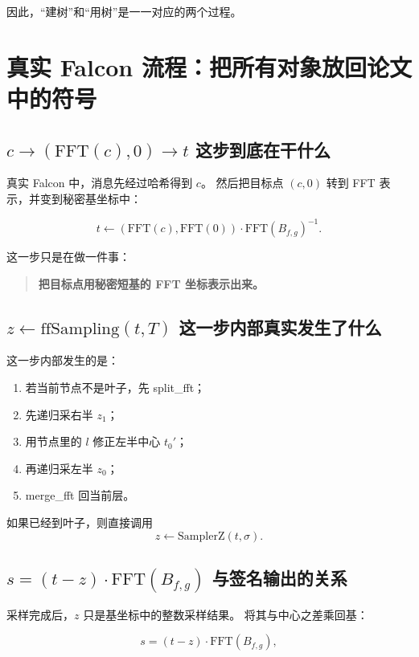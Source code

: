 \documentclass[11pt,a4paper]{ctexart}
\begin{document}
因此，“建树”和“用树”是一一对应的两个过程。

\section{真实 Falcon 流程：把所有对象放回论文中的符号}

\subsection{\(c \to (\mathrm{FFT}(c),0)\to t\) 这步到底在干什么}

真实 Falcon 中，消息先经过哈希得到 \(c\)。  
然后把目标点 \((c,0)\) 转到 FFT 表示，并变到秘密基坐标中：

\[
t \leftarrow (\mathrm{FFT}(c),\mathrm{FFT}(0))\cdot \mathrm{FFT}(B_{f,g})^{-1}.
\]

这一步只是在做一件事：

\begin{quote}
\textbf{把目标点用秘密短基的 FFT 坐标表示出来。}
\end{quote}

\subsection{\(z\leftarrow \mathrm{ffSampling}(t,T)\) 这一步内部真实发生了什么}

这一步内部发生的是：

\begin{enumerate}
    \item 若当前节点不是叶子，先 split\_fft；
    \item 先递归采右半 \(z_1\)；
    \item 用节点里的 \(l\) 修正左半中心 \(t_0'\)；
    \item 再递归采左半 \(z_0\)；
    \item merge\_fft 回当前层。
\end{enumerate}

如果已经到叶子，则直接调用
\[
z\leftarrow \mathrm{SamplerZ}(t,\sigma).
\]

\subsection{\(s=(t-z)\cdot \mathrm{FFT}(B_{f,g})\) 与签名输出的关系}

采样完成后，\(z\) 只是基坐标中的整数采样结果。  
将其与中心之差乘回基：

\[
s=(t-z)\cdot \mathrm{FFT}(B_{f,g}),
\]
\end{document}
